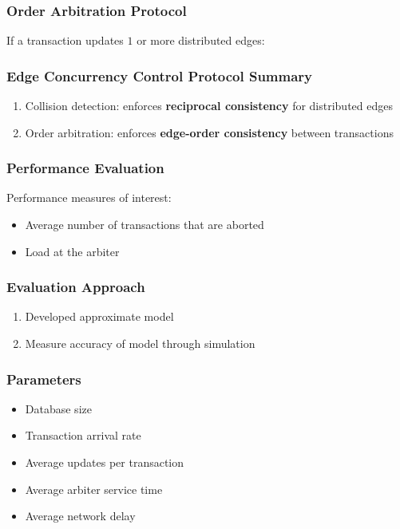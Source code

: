 \documentclass[aspectratio=169]{beamer}
\begin{document}
\begin{frame}
  \frametitle{Order Arbitration Protocol}
  If a transaction updates $1$ or more distributed edges:
  \begin{itemize}
  \end{itemize}
\end{frame}

\begin{frame}
  \frametitle{Edge Concurrency Control Protocol Summary}
    \begin{enumerate}
    \item Collision detection: enforces \textbf{reciprocal consistency} for distributed edges
    \item Order arbitration: enforces \textbf{edge-order consistency} between transactions
    \end{enumerate}
\end{frame}



\begin{frame}
  \frametitle{Performance Evaluation}
  Performance measures of interest:
  \begin{itemize}
  \item Average number of transactions that are aborted
  \item Load at the arbiter
  \end{itemize}
\end{frame}

\begin{frame}
  \frametitle{Evaluation Approach}
  \begin{enumerate}
  \item Developed approximate model
  \item Measure accuracy of model through simulation
  \end{enumerate}
\end{frame}

\begin{frame}
  \frametitle{Parameters}
  \begin{itemize}
  \item Database size
  \item Transaction arrival rate
  \item Average updates per transaction
  \item Average arbiter service time
  \item Average network delay
  \end{itemize}
\end{frame}
\end{document}
